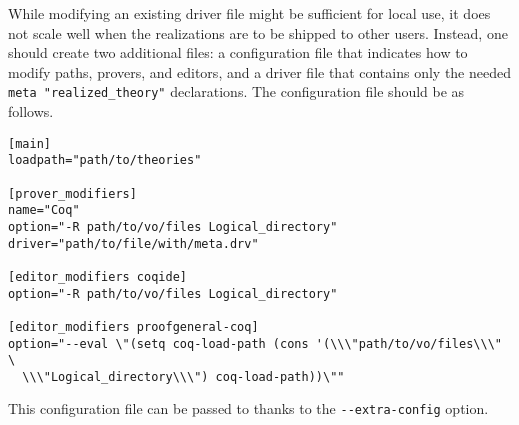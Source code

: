 While modifying an existing driver file might be sufficient for local
use, it does not scale well when the realizations are to be shipped to
other users. Instead, one should create two additional files: a
configuration file that indicates how to modify paths, provers, and
editors, and a driver file that contains only the needed
\verb+meta "realized_theory"+ declarations. The configuration file should be as
follows.

\begin{verbatim}
[main]
loadpath="path/to/theories"

[prover_modifiers]
name="Coq"
option="-R path/to/vo/files Logical_directory"
driver="path/to/file/with/meta.drv"

[editor_modifiers coqide]
option="-R path/to/vo/files Logical_directory"

[editor_modifiers proofgeneral-coq]
option="--eval \"(setq coq-load-path (cons '(\\\"path/to/vo/files\\\" \
  \\\"Logical_directory\\\") coq-load-path))\""
\end{verbatim}

This configuration file can be passed to \why thanks to the
\verb+--extra-config+ option.











